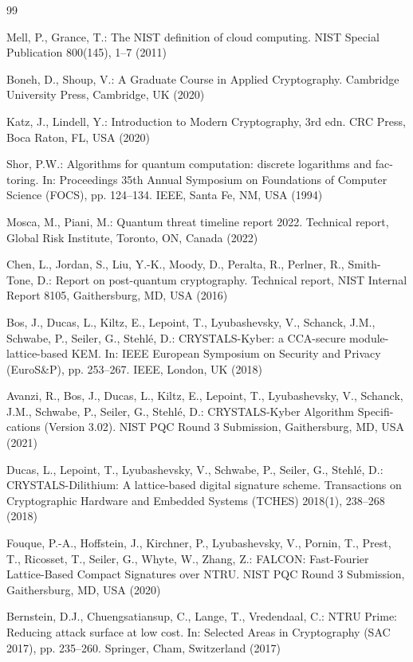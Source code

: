 \documentclass[5p,times]{elsarticle}
\begin{document}
\begin{thebibliography}{99}

Mell, P., Grance, T.: The NIST definition of cloud computing. NIST Special Publication 800(145), 1--7 (2011)

Boneh, D., Shoup, V.: A Graduate Course in Applied Cryptography. Cambridge University Press, Cambridge, UK (2020)

Katz, J., Lindell, Y.: Introduction to Modern Cryptography, 3rd edn. CRC Press, Boca Raton, FL, USA (2020)

Shor, P.W.: Algorithms for quantum computation: discrete logarithms and fac- toring. In: Proceedings 35th Annual Symposium on Foundations of Computer Science (FOCS), pp. 124--134. IEEE, Santa Fe, NM, USA (1994)

Mosca, M., Piani, M.: Quantum threat timeline report 2022. Technical report, Global Risk Institute, Toronto, ON, Canada (2022)

Chen, L., Jordan, S., Liu, Y.-K., Moody, D., Peralta, R., Perlner, R., Smith- Tone, D.: Report on post-quantum cryptography. Technical report, NIST Internal Report 8105, Gaithersburg, MD, USA (2016)

Bos, J., Ducas, L., Kiltz, E., Lepoint, T., Lyubashevsky, V., Schanck, J.M., Schwabe, P., Seiler, G., Stehl{\'e}, D.: CRYSTALS-Kyber: a CCA-secure module- lattice-based KEM. In: IEEE European Symposium on Security and Privacy (EuroS\&P), pp. 253--267. IEEE, London, UK (2018)

Avanzi, R., Bos, J., Ducas, L., Kiltz, E., Lepoint, T., Lyubashevsky, V., Schanck, J.M., Schwabe, P., Seiler, G., Stehl{\'e}, D.: CRYSTALS-Kyber Algorithm Specifi- cations (Version 3.02). NIST PQC Round 3 Submission, Gaithersburg, MD, USA (2021)

Ducas, L., Lepoint, T., Lyubashevsky, V., Schwabe, P., Seiler, G., Stehl{\'e}, D.: CRYSTALS-Dilithium: A lattice-based digital signature scheme. Transactions on Cryptographic Hardware and Embedded Systems (TCHES) 2018(1), 238--268 (2018)

Fouque, P.-A., Hoffstein, J., Kirchner, P., Lyubashevsky, V., Pornin, T., Prest, T., Ricosset, T., Seiler, G., Whyte, W., Zhang, Z.: FALCON: Fast-Fourier Lattice-Based Compact Signatures over NTRU. NIST PQC Round 3 Submission, Gaithersburg, MD, USA (2020)

Bernstein, D.J., Chuengsatiansup, C., Lange, T., Vredendaal, C.: NTRU Prime: Reducing attack surface at low cost. In: Selected Areas in Cryptography (SAC 2017), pp. 235--260. Springer, Cham, Switzerland (2017)


\end{thebibliography}
\end{document}
